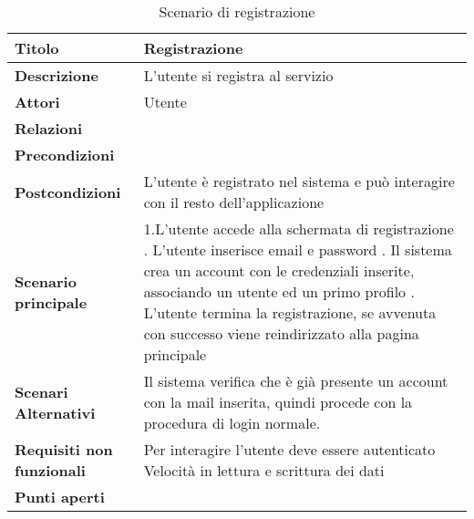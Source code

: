 \begin{table}[htbp]
    \begin{tabular} {|P{4.5cm}|P{11cm}|}
        \hline
        \textbf{Titolo}                   & Registrazione                                                                         \\
        \hline
        \textbf{Descrizione}              & L'utente si registra al servizio                                                      \\
        \hline
        \textbf{Attori}                   & Utente                                                                                \\
        \hline
        \textbf{Relazioni}                &                                                                                       \\
        \hline
        \textbf{Precondizioni}            &                                                                                       \\
        \hline
        \textbf{Postcondizioni}           & L'utente è registrato nel sistema e può interagire con il resto dell'applicazione     \\
        \hline
        \textbf{Scenario principale}      & 1.L'utente accede alla schermata di registrazione      . L'utente inserisce email e  password                      . Il sistema crea un account con le credenziali inserite, associando un utente ed un primo profilo   . L'utente termina la registrazione, se avvenuta con successo viene reindirizzato alla pagina principale
        \\
        \hline
        \textbf{Scenari Alternativi}      &

        Il sistema verifica che è già presente un account con la mail inserita, quindi procede con la procedura di login normale. \\
        \hline
        \textbf{Requisiti non funzionali} &
        Per interagire l’utente deve essere autenticato \linebreak
        Velocità in lettura e scrittura dei dati                                                                                  \\
        \hline
        \textbf{Punti aperti}             &                                                                                       \\
        \hline
    \end{tabular}

    \caption{Scenario di registrazione}
\end{table}
